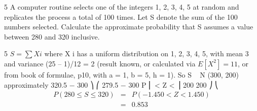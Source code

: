 \documentclass[a4paper,12pt]{article}
\begin{document}
5
A computer routine selects one of the integers 1, 2, 3, 4, 5 at random and replicates
the process a total of 100 times. Let S denote the sum of the 100 numbers selected.
Calculate the approximate probability that S assumes a value between 280 and 320
inclusive.


5
$S = \sum X i$ where X i has a uniform distribution on 1, 2, 3, 4, 5, with mean 3 and variance
(25 – 1)/12 = 2 (result known, or calculated via $E [ X^2 ] = 11$, or from book of formulae,
p10, with a = 1, b = 5, h = 1).
So S ~ N (300, 200) approximately
320.5 − 300 ⎞
⎛ 279.5 − 300
 P ⎜
< Z <
⎟
200
200 ⎠
⎝
\begin{eqnarray*}
P (280 \leq S \leq 320) &=& P ( − 1.450 < Z < 1.450 ) \\
&=& 0.853\\
\end{eqnarray*}
\end{document}
